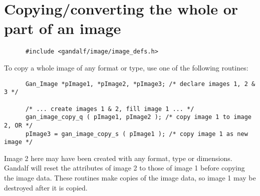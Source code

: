 \section{Copying/converting the whole or part of an image}
\begin{verbatim}
      #include <gandalf/image/image_defs.h>
\end{verbatim}
To copy a whole image of any format or type, use one of the following
routines:
\begin{verbatim}
      Gan_Image *pImage1, *pImage2, *pImage3; /* declare images 1, 2 & 3 */

      /* ... create images 1 & 2, fill image 1 ... */
      gan_image_copy_q ( pImage1, pImage2 ); /* copy image 1 to image 2, OR */
      pImage3 = gan_image_copy_s ( pImage1 ); /* copy image 1 as new image */
\end{verbatim}
Image 2 here may have been created with any format, type or dimensions.
Gandalf will reset the attributes of image 2 to those of image 1 before
copying the image data. These routines make copies of the image data,
so image 1 may be destroyed after it is copied.

